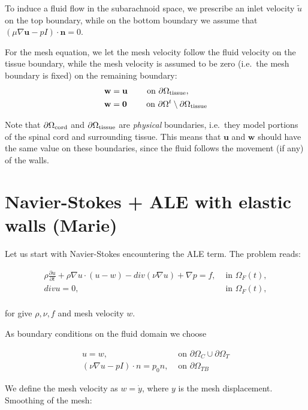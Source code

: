 \documentclass[11pt,a4paper,titlepage]{report}
\begin{document}
To induce a fluid flow in the subarachnoid space, we prescribe an
inlet velocity $\tilde{u}$ on the top boundary, while on the bottom
boundary we assume that $ \left ( \mu \nabla \mathbf{u} - p I \right )
\cdot \mathbf{n} = 0$.

For the mesh equation, we let the mesh velocity follow the fluid
velocity on the tissue boundary, while the mesh velocity is assumed to
be zero (i.e.~the mesh boundary is fixed) on the remaining boundary:
\begin{align}
\mathbf{w} &= \mathbf{u}  \qquad \text{ on } \partial \Omega_{\rm tissue},\\
\mathbf{w} &= \mathbf{0}  \qquad \text{ on } \partial \Omega^t \setminus \partial \Omega_{\rm tissue}
\end{align}

Note that $\partial \Omega_{\rm cord}$ and $\partial \Omega_{\rm
  tissue}$ are \textit{physical} boundaries, i.e.~they model portions
of the spinal cord and surrounding tissue. This means that
$\mathbf{u}$ and $\mathbf{w}$ should have the same value on these
boundaries, since the fluid follows the movement (if any) of the
walls.

\section{Navier-Stokes + ALE with elastic walls (Marie)}
Let us start with Navier-Stokes encountering the ALE term. The problem reads:

\[
\begin{aligned}
\rho \frac{\partial u}{\partial t} + \rho \nabla u \cdot (u-w) - div(\nu \nabla u) + \nabla p = f  , & \text{ in } \Omega_F (t), \\
div u = 0, & \text{ in } \Omega_F (t), \\
\end{aligned}
\]

for give $\rho, \nu, f$ and mesh velocity $w$.

As boundary conditions on the fluid domain we choose

\[
\begin{aligned}
u = w, & \text{ on } \partial \Omega_C \cup \partial \Omega_T \\
(\nu \nabla u - pI) \cdot n = p_0 n, & \text{ on } \partial \Omega_{TB}
\end{aligned}
\]

We define the mesh velocity as $w = \dot{y}$, where $y$ is the mesh displacement. \\
Smoothing of the mesh:
\end{document}
